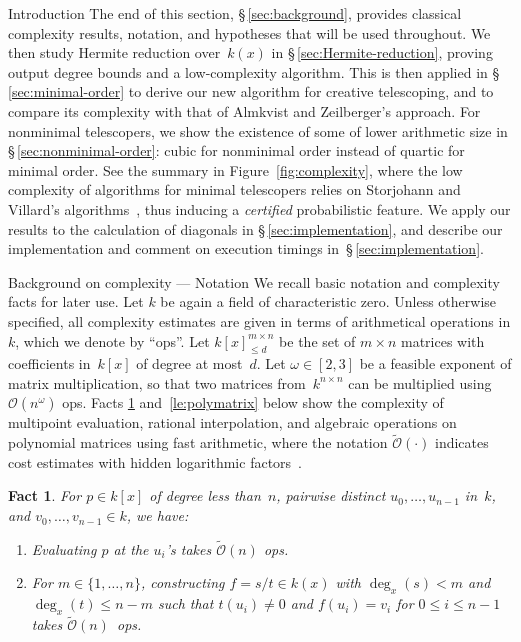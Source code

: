 \documentclass{sig-alt-full}
\newcommand{\bigO}{{\mathcal{O}}}
\newcommand{\bigOsoft}{\tilde{\mathcal{O}}}
\newtheorem{fact}[lemma]{Fact}
\begin{document}
\begin{section}{Introduction}
The end of this section, \S\,\ref{sec:background}, provides classical
complexity results, notation, and hypotheses that will be used
throughout.  We then study Hermite reduction over~$k(x)$ in
\S\,\ref{sec:Hermite-reduction}, proving output degree bounds and a
low-complexity algorithm.  This is then applied in
\S\,\ref{sec:minimal-order} to derive our new algorithm for creative
telescoping, and to compare its complexity with that of Almkvist and
Zeilberger's approach.
For nonminimal telescopers, we show the existence
of some of lower arithmetic size in \S\,\ref{sec:nonminimal-order}:
cubic for nonminimal order instead of quartic for minimal order.
See the summary in Figure~\ref{fig:complexity}, where the low
complexity of algorithms for minimal telescopers relies on Storjohann
and Villard's algorithms~\cite{Storjohann2005}, thus inducing a
\emph{certified\/} probabilistic feature.
We apply our results to the
calculation of diagonals in \S\,\ref{sec:implementation}, and describe our
implementation and comment on execution timings
in~\S\,\ref{sec:implementation}.

\begin{subsection}{Background on complexity --- Notation}
\label{sec:background} We recall basic notation and complexity facts
for later use. Let $k$ be again a field of characteristic zero.
Unless otherwise specified, all complexity estimates are given in
terms of arithmetical operations in $k$, which we denote by ``ops''.
Let $k[x]_{\leq d}^{m\times n}$ be the set of $m\times n$ matrices
with coefficients in~$k[x]$ of degree at most~$d$. Let
$\omega\in[2,3]$ be a feasible exponent of matrix multiplication, so
that two matrices from~$k^{n\times n}$ can be multiplied using
$\bigO(n^{\omega})$ ops.
Facts \ref{EvaInter} and~\ref{le:polymatrix} below
show the complexity of multipoint evaluation, rational
interpolation,
and algebraic operations on polynomial matrices using fast
arithmetic, where the notation $\bigOsoft(\cdot)$ indicates
cost estimates with hidden logarithmic
factors~\cite[Def.~25.8]{MCA2003}.

\begin{fact}\label{EvaInter}
For $p\in k[x]$ of degree less than~$n$, pairwise
distinct $u_0,\dots, u_{n-1}$ in~$k$, and $v_0, \dots, v_{n-1}\in k$,
we have:
\vspace{-0.15cm}
\begin{enumerate}
\item[(i)] Evaluating $p$ at the $u_i$'s takes $\bigOsoft(n)$ ops.
\vspace{-0.2cm}
\item[(ii)] For $m\in \{1, \dots, n\}$, constructing
$f=s/t\in k(x)$ with $\deg_x(s)<m$ and $\deg_x(t)\le n-m$ such that
$t(u_i)\neq 0$ and $f(u_i)=v_i$ for $0\le i\le n-1$ takes
$\bigOsoft(n)$~ops.
\end{enumerate}
\end{fact}


\end{subsection}
\end{section}
\end{document}
